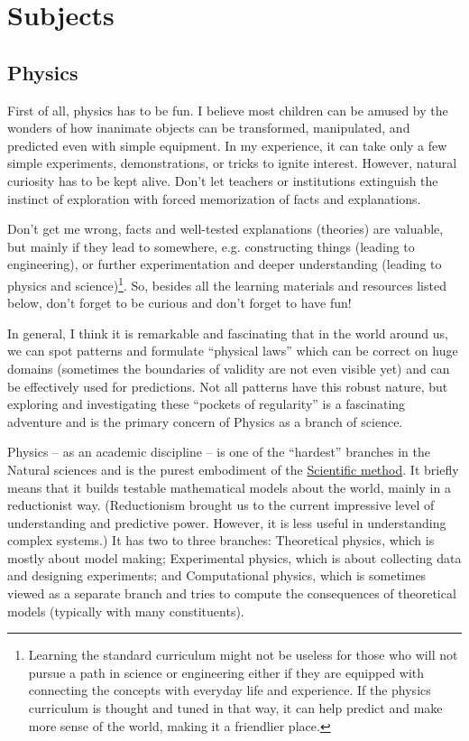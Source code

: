 \documentclass{article}
\begin{document}
\section{Subjects}

\subsection{Physics}

First of all, physics has to be fun. I believe most children can be amused by the wonders of how inanimate objects can be transformed, manipulated, and predicted even with simple equipment. In my experience, it can take only a few simple experiments, demonstrations, or tricks to ignite interest.
However, natural curiosity has to be kept alive. Don't let teachers or institutions extinguish the instinct of exploration with forced memorization of facts and explanations.

Don't get me wrong, facts and well-tested explanations (theories) are valuable, but mainly if they lead to somewhere, e.g. constructing things (leading to engineering), or further experimentation and deeper understanding (leading to physics and science)\footnote{Learning the standard curriculum might not be useless for those who will not pursue a path in science or engineering either if they are equipped with connecting the concepts with everyday life and experience. If the physics curriculum is thought and tuned in that way, it can help predict and make more sense of the world, making it a friendlier place.}. So, besides all the learning materials and resources listed below, don't forget to be curious and don't forget to have fun! 

In general, I think it is remarkable and fascinating that in the world around us, we can spot patterns and formulate ``physical laws'' which can be correct on huge domains (sometimes the boundaries of validity are not even visible yet) and can be effectively used for predictions. Not all patterns have this robust nature, but exploring and investigating these ``pockets of regularity'' is a fascinating adventure and is the primary concern of Physics as a branch of science.

Physics -- as an academic discipline -- is one of the ``hardest'' branches in the Natural sciences and is the purest embodiment of the \href{https://plato.stanford.edu/entries/scientific-method/}{Scientific method}.
It briefly means that it builds testable mathematical models about the world, mainly in a reductionist way. (Reductionism brought us to the current impressive level of understanding and predictive power. However, it is less useful in understanding complex systems.)
It has two to three branches: Theoretical physics, which is mostly about model making; Experimental physics, which is about collecting data and designing experiments; and Computational physics, which is sometimes viewed as a separate branch and tries to compute the consequences of theoretical models (typically with many constituents).
\end{document}
